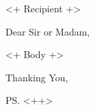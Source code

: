 \documentclass{letter}
\begin{document}
\begin{letter}{<+ Recipient +>}
\opening{Dear Sir or Madam,}
<+ Body +>

\closing{Thanking You,}
\end{letter}

\ps
<++>

\encl{<++>}
\cc{<++>}
\end{document}
